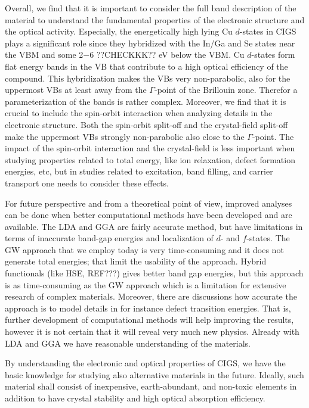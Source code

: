 \documentclass[a4paper, 12pt, titlepage,oneside,drop]{kthesis}
\begin{document}
Overall, we find that it is important to consider the full band description of the material to understand the
fundamental properties of the electronic structure and the optical activity. Especially, the energetically high
lying Cu $d$-states in CIGS plays a significant role since they hybridized with the In/Ga and Se states near the VBM and some 2$-$6 {??CHECKKK??} eV below the VBM.  Cu $d$-states form flat energy bands in the VB that contribute to a
high optical efficiency of the compound. This hybridization makes the VBs very non-parabolic, also for the uppermost VBs at least away from the $\Gamma$-point of the Brillouin zone. Therefor a parameterization of the bands is
rather complex. Moreover, we find that it is crucial to include the spin-orbit interaction when analyzing details in the electronic structure. Both the spin-orbit split-off and the crystal-field split-off make the uppermost VBs
strongly non-parabolic also close to the $\Gamma$-point. The impact of the spin-orbit interaction and the crystal-field is less important when studying properties related to total energy, like ion relaxation, defect formation 
energies, etc, but in studies related to excitation, band filling, and carrier transport one needs to consider these effects.        


\noindent 
For future perspective and from a theoretical point of view, improved analyses can be done when better computational methods have been developed and are available. The LDA and GGA are fairly accurate method, but have limitations 
in terms of inaccurate band-gap energies and localization of $d$- and $f$-states. The GW approach that we employ today is very time-consuming and it does not generate total energies; that limit the usability of the approach. 
Hybrid functionals (like HSE, REF???) gives better band gap energies, but this approach is as time-consuming as the GW approach which is a limitation for extensive research of complex materials. Moreover, there are discussions how
accurate the approach is to model details in for instance defect transition energies. 
That is, further development of computational methods will help improving the results, however it is not certain that
it will reveal very much new physics. Already with LDA and GGA we have reasonable understanding of the materials.    

By understanding the electronic and optical properties of CIGS, we have the basic knowledge for studying also 
alternative materials in the future. Ideally, such material shall consist of inexpensive, earth-abundant, 
and non-toxic elements in addition to have crystal stability and high optical absorption efficiency.  
\end{document}
